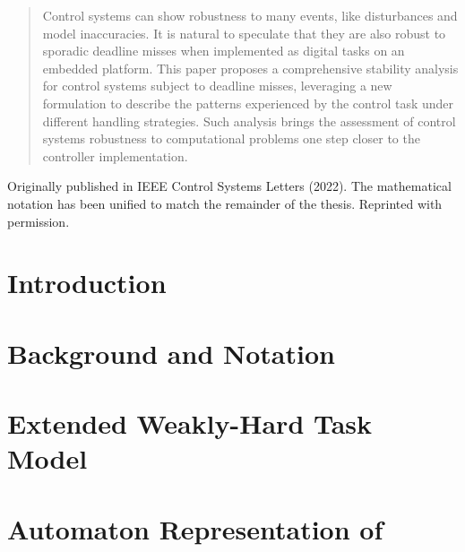 \renewcommand\thisdir{papers/lcss22}
\renewcommand\figdir{\thisdir/figs}




\begin{abstract}
    Control systems can show robustness to many events, like disturbances and model inaccuracies.
    It is natural to speculate that they are also robust to sporadic deadline misses when implemented as digital tasks on an embedded platform.
    This paper proposes a comprehensive stability analysis for control systems subject to deadline misses, leveraging a new formulation to describe the patterns experienced by the control task under different handling strategies.
    Such analysis brings the assessment of control systems robustness to computational problems one step closer to the controller implementation.
\end{abstract}

\vfill
Originally published in IEEE Control Systems Letters (2022).
The mathematical notation has been unified to match the remainder of the thesis.
Reprinted with permission.
\newpage

\section{Introduction}
\label{sec:intro}


\section{Background and Notation}
\label{sec:background}


\section{Extended Weakly-Hard Task Model}
\label{sec:model}


\section{Automaton Representation of \ewhc{}}
\label{sec:state-machine}


